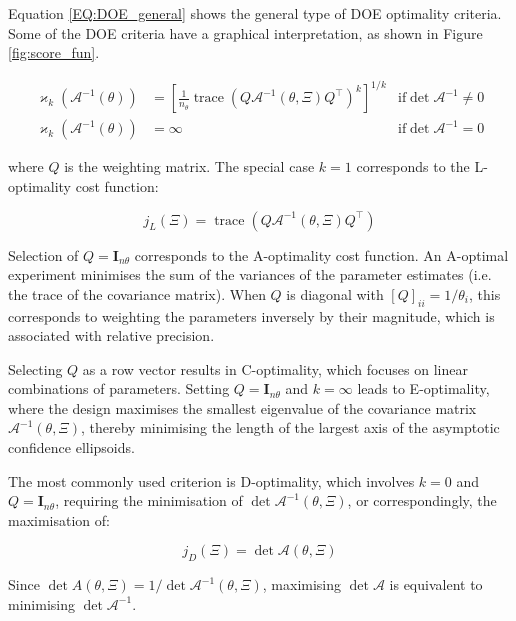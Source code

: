 \documentclass[a4paper,fleqn]{cas-dc}
\begin{document}
		Equation \ref{EQ:DOE_general} shows the general type of DOE optimality criteria. Some of the DOE criteria have a graphical interpretation, as shown in Figure \ref{fig:score_fun}.
		
		{\footnotesize 
			\begin{align} \label{EQ:DOE_general}
				\varkappa_k\left( \mathcal{A}^{-1}(\theta) \right) &= \left[ \frac{1}{n_\theta} \operatorname{trace}\left( Q \mathcal{A}^{-1}(\theta, \Xi) Q^\top \right)^k \right]^{1/k} & \text{if} \det \mathcal{A}^{-1} \neq 0 \nonumber \\ 
				\varkappa_k\left( \mathcal{A}^{-1}(\theta) \right) &= \infty & \text{if} \det \mathcal{A}^{-1} = 0
		\end{align} }
		
		where $Q$ is the weighting matrix. The special case $k=1$ corresponds to the L-optimality cost function:
		
		{\footnotesize \begin{equation} j_L(\Xi) = \operatorname{trace} \left( Q \mathcal{A}^{-1}(\theta, \Xi) Q^\top \right) \end{equation} }
		
		Selection of $Q = \mathbf{I}_{n\theta}$ corresponds to the A-optimality cost function. An A-optimal experiment minimises the sum of the variances of the parameter estimates (i.e. the trace of the covariance matrix). When $Q$ is diagonal with $[Q]_{ii} = 1/\theta_i$, this corresponds to weighting the parameters inversely by their magnitude, which is associated with relative precision.
		
		Selecting $Q$ as a row vector results in C-optimality, which focuses on linear combinations of parameters. Setting $Q = \mathbf{I}_{n\theta}$ and $k = \infty$ leads to E-optimality, where the design maximises the smallest eigenvalue of the covariance matrix $\mathcal{A}^{-1}(\theta, \Xi)$, thereby minimising the length of the largest axis of the asymptotic confidence ellipsoids.
		
		The most commonly used criterion is D-optimality, which involves $k = 0$ and $Q = \mathbf{I}_{n\theta}$, requiring the minimisation of $\det \mathcal{A}^{-1}(\theta, \Xi)$, or correspondingly, the maximisation of:
		
		{\footnotesize \begin{equation} j_D(\Xi) = \det \mathcal{A}(\theta, \Xi) \end{equation} }
		
		Since $\det A(\theta, \Xi) = 1 / \det \mathcal{A}^{-1}(\theta, \Xi)$, maximising $\det \mathcal{A}$ is equivalent to minimising $\det \mathcal{A}^{-1}$.
		
\end{document}
